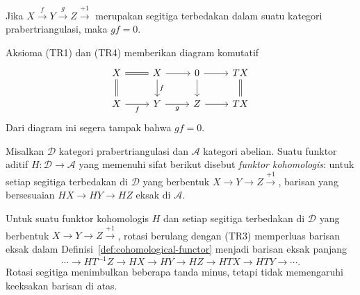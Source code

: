 
\begin{lema}\label{prop:dt-composite-null}
	Jika $X \xrightarrow{f} Y \xrightarrow{g} Z \xrightarrow{+1}$ merupakan
	segitiga terbedakan dalam suatu kategori prabertriangulasi, maka $gf=0$.
\end{lema}

\begin{bukti}
	Aksioma (TR1) dan (TR4) memberikan diagram komutatif
	\[\begin{tikzcd}
		X \arrow[equal, d] \arrow[equal, r] & X \arrow[r] \arrow[d, "f"] & 0 \arrow[d] \arrow[r] & TX \arrow[equal, d] \\
		X \arrow[r, "f"'] & Y \arrow[r, "g"'] & Z \arrow[r] & TX
	\end{tikzcd}\]
	Dari diagram ini segera tampak bahwa $gf=0$.
\end{bukti}

\begin{definisi}\label{def:cohomological-functor}
	Misalkan $\mathcal{D}$ kategori prabertriangulasi dan $\mathcal{A}$ kategori
	abelian. Suatu funktor aditif $H: \mathcal{D} \to \mathcal{A}$ yang
	memenuhi sifat berikut disebut \emph{funktor kohomologis}: untuk setiap
	segitiga terbedakan di $\mathcal{D}$ yang berbentuk
	$X \to Y \to Z \xrightarrow{+1}$, barisan yang bersesuaian
	$HX \to HY \to HZ$ eksak di $\mathcal{A}$.
\end{definisi}

\begin{catatan}\label{rem:cohomological-functor-long}
	Untuk suatu funktor kohomologis $H$ dan setiap segitiga terbedakan di
	$\mathcal{D}$ yang berbentuk $X \to Y \to Z \xrightarrow{+1}$, rotasi
	berulang dengan (TR3) memperluas barisan eksak dalam
	Definisi~\ref{def:cohomological-functor} menjadi barisan eksak panjang
	\[ \cdots \to HT^{-1}Z \to HX \to HY \to HZ \to HTX \to HTY \to \cdots . \]
	Rotasi segitiga menimbulkan beberapa tanda minus, tetapi tidak memengaruhi
	keeksakan barisan di atas.
\end{catatan}

